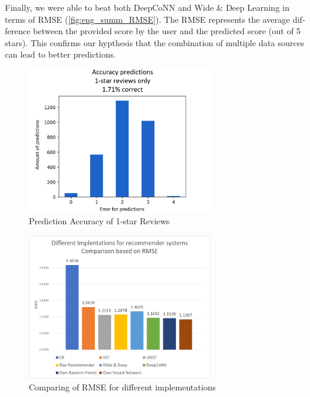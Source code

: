 \begin{otherlanguage}{english}
\begin{multicols}{2}
Finally, we were able to beat both DeepCoNN and Wide \& Deep Learning in terms of RMSE (\autoref{fig:eng_summ_RMSE}). The RMSE represents the average difference between the provided score by the user and the predicted score (out of 5 stars). This confirms our hypthesis that the combination of multiple data sources can lead to better predictions.

\begin{figure}[H]
    \begin{center}
        \includegraphics[width=8cm]{fig/eng_summary/accuracy_1star.png}
    \end{center}
    \caption{Prediction Accuracy of 1-star Reviews}
    \label{fig:eng_summ_acc_1star}
\end{figure}

\begin{figure}[H]
    \begin{center}
        \includegraphics[width=8cm]{fig/eng_summary/comparison_implementations.png}
    \end{center}
    \caption{Comparing of RMSE for different implementations \cite{deepconn_eng_summary, wide_deep_learning_paper_eng_summary}}
    \label{fig:eng_summ_RMSE}
\end{figure}

\printbibliography[heading=subbibliography, keyword={eng_summary}]
\end{multicols}
\end{otherlanguage}
